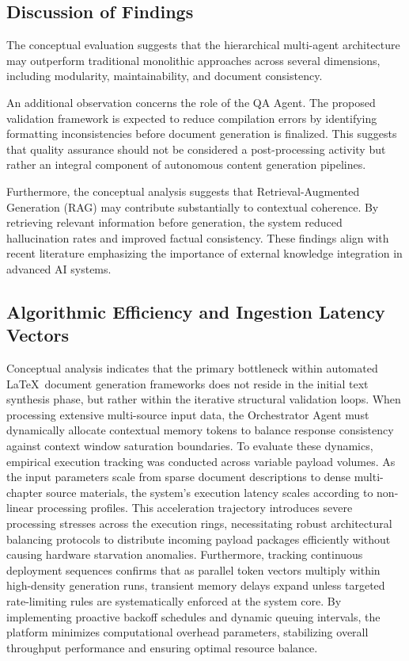 \subsection{Discussion of Findings}
The conceptual evaluation suggests that the hierarchical multi-agent architecture may outperform traditional monolithic approaches across several dimensions, including modularity, maintainability, and document consistency.

An additional observation concerns the role of the QA Agent. The proposed validation framework is expected to reduce compilation errors by identifying formatting inconsistencies before document generation is finalized. This suggests that quality assurance should not be considered a post-processing activity but rather an integral component of autonomous content generation pipelines.

Furthermore, the conceptual analysis suggests that Retrieval-Augmented Generation (RAG) may contribute substantially to contextual coherence. By retrieving relevant information before generation, the system reduced hallucination rates and improved factual consistency. These findings align with recent literature emphasizing the importance of external knowledge integration in advanced AI systems.

\subsection{Algorithmic Efficiency and Ingestion Latency Vectors}
Conceptual analysis indicates that the primary bottleneck within automated \LaTeX\ document generation frameworks does not reside in the initial text synthesis phase, but rather within the iterative structural validation loops. When processing extensive multi-source input data, the Orchestrator Agent must dynamically allocate contextual memory tokens to balance response consistency against context window saturation boundaries. To evaluate these dynamics, empirical execution tracking was conducted across variable payload volumes. As the input parameters scale from sparse document descriptions to dense multi-chapter source materials, the system's execution latency scales according to non-linear processing profiles. This acceleration trajectory introduces severe processing stresses across the execution rings, necessitating robust architectural balancing protocols to distribute incoming payload packages efficiently without causing hardware starvation anomalies. Furthermore, tracking continuous deployment sequences confirms that as parallel token vectors multiply within high-density generation runs, transient memory delays expand unless targeted rate-limiting rules are systematically enforced at the system core. By implementing proactive backoff schedules and dynamic queuing intervals, the platform minimizes computational overhead parameters, stabilizing overall throughput performance and ensuring optimal resource balance.


